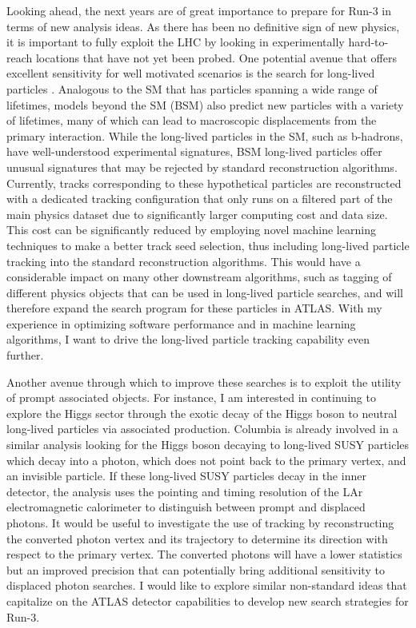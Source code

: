 \documentclass[a4paper]{article}
\begin{document}
Looking ahead, the next years are of great importance to prepare for Run-3 in terms of new analysis ideas. As there has been no definitive sign of new physics,
it is important to fully exploit the LHC by looking in experimentally hard-to-reach locations that have not yet been probed.
One potential avenue that offers excellent sensitivity for well motivated scenarios is the search for long-lived particles
\cite{alimena2019searching}.
Analogous to the SM that has particles spanning a wide range of lifetimes, models beyond the SM (BSM) also predict new particles
with a variety of lifetimes, many of which can lead to macroscopic displacements from the primary interaction.
While the long-lived particles in the SM, such as b-hadrons, have well-understood experimental signatures, BSM long-lived particles
offer unusual signatures that may be rejected by standard reconstruction algorithms.
Currently, tracks corresponding to these hypothetical particles are reconstructed with a dedicated tracking configuration that only runs
on a filtered part of the main physics dataset due to significantly larger computing cost and data size. This cost can be significantly reduced
by employing novel machine learning techniques to make a better track seed selection, thus including long-lived particle tracking
into the standard reconstruction algorithms. This would have a considerable impact on many other downstream algorithms, such as tagging of different
physics objects that can be used in long-lived particle searches, and will therefore expand the search program for these particles in ATLAS.
With my experience in optimizing software performance and in machine learning algorithms, I want to drive the long-lived particle tracking capability even further.

Another avenue through which to improve these searches is to exploit the utility of prompt associated objects.
For instance, I am interested in continuing to explore the Higgs sector through the exotic decay of the Higgs boson to neutral long-lived particles
via associated production. Columbia is already involved in a similar analysis looking for the Higgs boson
decaying to long-lived SUSY particles which decay into a photon, which does not point back to the primary vertex, and an invisible particle.
If these long-lived SUSY particles decay in the inner detector, the analysis uses the pointing and timing resolution of the LAr electromagnetic calorimeter to distinguish between prompt and displaced photons.
It would be useful to investigate the use of tracking by reconstructing the converted photon vertex and its trajectory to determine
its direction with respect to the primary vertex. The converted photons will have a lower statistics but an improved precision that
can potentially bring additional sensitivity to displaced photon searches.
I would like to explore similar non-standard ideas that capitalize on the ATLAS detector capabilities to develop new search strategies for Run-3.
\end{document}
